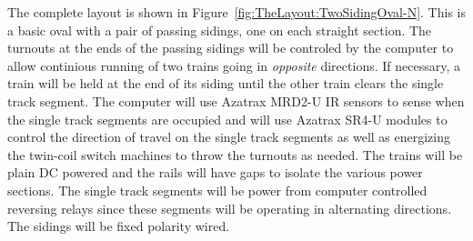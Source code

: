 The complete layout is shown in
Figure~\ref{fig:TheLayout:TwoSidingOval-N}. This is a basic oval with a
pair of passing sidings, one on each straight section. The turnouts at
the ends of the passing sidings will be controled by the computer to
allow continious running of two trains going in \textit{opposite}
directions.  If necessary, a train will be held at the end of its
siding until the other train clears the single track segment. The
computer will use Azatrax MRD2-U IR sensors to sense when the single
track segments are occupied and will use Azatrax SR4-U modules to
control the  direction of travel on the single track segments as well
as energizing the twin-coil switch machines to throw the turnouts as
needed. The trains will be plain DC powered and the rails will have gaps
to isolate the various power sections.  The single track segments will
be power from computer controlled reversing relays since these segments
will be operating in alternating directions.  The sidings will be fixed
polarity wired.

